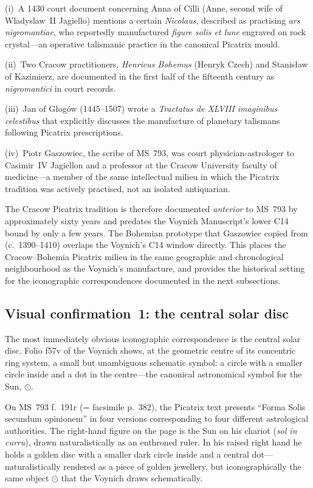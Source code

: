 \noindent (i)~A 1430 court document concerning Anna of Cilli (Anne, second
wife of Wladyslaw~II Jagiello) mentions a certain \textit{Nicolaus},
described as practising \textit{ars nigromantiae}, who reportedly
manufactured \textit{figure solis et lune} engraved on rock crystal---an
operative talismanic practice in the canonical Picatrix mould.

\noindent (ii)~Two Cracow practitioners, \textit{Henricus Bohemus} (Henryk
Czech) and Stanis\l aw of Kazimierz, are documented in the first half of
the fifteenth century as \textit{nigromantici} in court records.

\noindent (iii)~Jan of G\l og\'ow (1445--1507) wrote a
\textit{Tractatus de XLVIII imaginibus celestibus} that explicitly
discusses the manufacture of planetary talismans following Picatrix
prescriptions.

\noindent (iv)~Piotr Gaszowiec, the scribe of MS~793, was court
physician-astrologer to Casimir~IV Jagiellon and a professor at the
Cracow University faculty of medicine---a member of the same intellectual
milieu in which the Picatrix tradition was actively practised, not an
isolated antiquarian.

The Cracow Picatrix tradition is therefore documented \emph{anterior} to
MS~793 by approximately sixty years and predates the Voynich Manuscript's
lower C14 bound by only a few years. The Bohemian prototype that
Gaszowiec copied from (c.~1390--1410) overlaps the Voynich's C14 window
directly. This places the Cracow--Bohemia Picatrix milieu in the same
geographic and chronological neighbourhood as the Voynich's
manufacture, and provides the historical setting for the iconographic
correspondences documented in the next subsections.

\subsection{Visual confirmation~1: the central solar disc}
\label{sec:vc1_disc}

The most immediately obvious iconographic correspondence is the central
solar disc. Folio f57v of the Voynich shows, at the geometric centre of
its concentric ring system, a small but unambiguous schematic symbol: a
circle with a smaller circle inside and a dot in the centre---the
canonical astronomical symbol for the Sun, $\odot$.

On MS~793 f.~191r (= facsimile p.~382), the Picatrix text presents
``Forma Solis secundum opinionem'' in four versions corresponding to four
different astrological authorities. The right-hand figure on the page is
the Sun on his chariot (\textit{sol in curru}), drawn naturalistically as
an enthroned ruler. In his raised right hand he holds a golden disc with
a smaller dark circle inside and a central dot---naturalistically rendered
as a piece of golden jewellery, but iconographically the same object
$\odot$ that the Voynich draws schematically.

